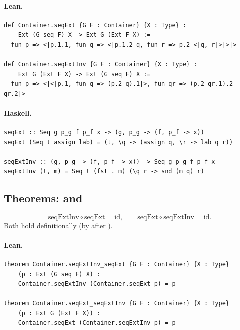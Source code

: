 \documentclass[11pt,a4paper]{article}
\begin{document}
\paragraph{Lean.}
\begin{lstlisting}[style=lean]
def Container.seqExt {G F : Container} {X : Type} :
    Ext (G seq F) X -> Ext G (Ext F X) :=
  fun p => <|p.1.1, fun q => <|p.1.2 q, fun r => p.2 <|q, r|>|>|>

def Container.seqExtInv {G F : Container} {X : Type} :
    Ext G (Ext F X) -> Ext (G seq F) X :=
  fun p => <|<|p.1, fun q => (p.2 q).1|>, fun qr => (p.2 qr.1).2 qr.2|>
\end{lstlisting}

\paragraph{Haskell.}
\begin{lstlisting}[style=haskell]
seqExt :: Seq g p_g f p_f x -> (g, p_g -> (f, p_f -> x))
seqExt (Seq t assign lab) = (t, \q -> (assign q, \r -> lab q r))

seqExtInv :: (g, p_g -> (f, p_f -> x)) -> Seq g p_g f p_f x
seqExtInv (t, m) = Seq t (fst . m) (\q r -> snd (m q) r)
\end{lstlisting}


\subsection{Theorems:  and }

\begin{thm}
\[
  \mathrm{seqExtInv} \circ \mathrm{seqExt} = \mathrm{id},
  \qquad
  \mathrm{seqExt} \circ \mathrm{seqExtInv} = \mathrm{id}.
\]
Both hold definitionally (by  after ).
\end{thm}

\paragraph{Lean.}
\begin{lstlisting}[style=lean]
theorem Container.seqExtInv_seqExt {G F : Container} {X : Type}
    (p : Ext (G seq F) X) :
    Container.seqExtInv (Container.seqExt p) = p

theorem Container.seqExt_seqExtInv {G F : Container} {X : Type}
    (p : Ext G (Ext F X)) :
    Container.seqExt (Container.seqExtInv p) = p
\end{lstlisting}
\end{document}
